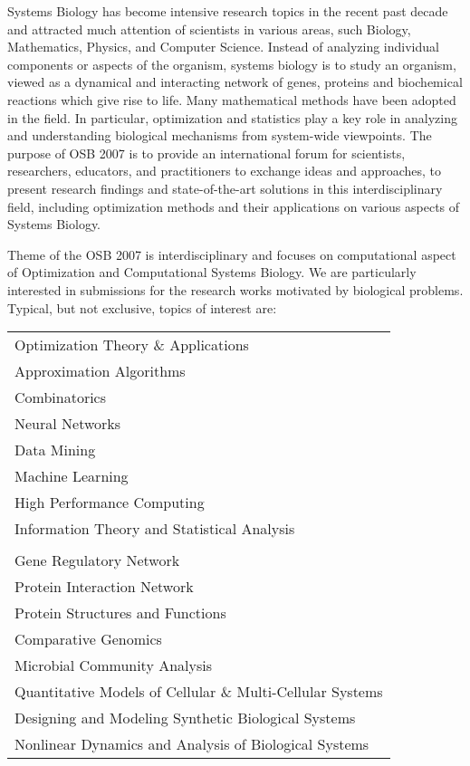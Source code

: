  \noindent
Systems Biology has become intensive research topics in the recent
past decade and attracted much attention of scientists in various
areas, such Biology, Mathematics, Physics, and Computer Science.
Instead of analyzing individual components or aspects of the
organism, systems biology is to study an organism, viewed as a
dynamical and interacting network of genes, proteins and biochemical
reactions which give rise to life. Many mathematical methods have
been adopted in the field. In particular, optimization and
statistics play a key role in analyzing and understanding biological
mechanisms from system-wide viewpoints. The purpose of OSB 2007 is
to provide an international forum for scientists, researchers,
educators, and practitioners to exchange ideas and approaches, to
present research findings and state-of-the-art solutions in this
interdisciplinary field, including optimization methods and their
applications on various aspects of Systems Biology.

 \medskip

 \noindent
Theme of the OSB 2007 is interdisciplinary and focuses on
computational aspect of Optimization and Computational Systems
Biology. We are particularly interested in submissions for the
research works motivated by biological problems. Typical, but not
exclusive, topics of interest are:

 \begin{center}
 \begin{tabular}{l}
  Optimization Theory \& Applications \\
  Approximation Algorithms \\
  Combinatorics \\
  Neural Networks \\
  Data Mining \\
  Machine Learning \\
  High Performance Computing \\
  Information Theory and Statistical Analysis \\
\\
  Gene Regulatory Network \\
  Protein Interaction Network \\
  Protein Structures and Functions \\
  Comparative Genomics \\
  Microbial Community Analysis \\
  Quantitative Models of Cellular \& Multi-Cellular Systems \\
  Designing and Modeling Synthetic Biological Systems \\
  Nonlinear Dynamics and Analysis of Biological Systems
 \end{tabular}
 \end{center}

